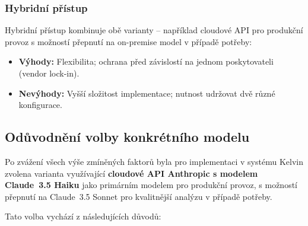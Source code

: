 \subsubsection*{Hybridní přístup}

Hybridní přístup kombinuje obě varianty -- například cloudové API pro produkční provoz s možností přepnutí na on-premise model v případě potřeby:
\begin{itemize}
    \item \textbf{Výhody:} Flexibilita; ochrana před závislostí na jednom poskytovateli (vendor lock-in).
    \item \textbf{Nevýhody:} Vyšší složitost implementace; nutnost udržovat dvě různé konfigurace.
\end{itemize}

\subsection{Odůvodnění volby konkrétního modelu}
\label{subsec:choice-justification}

Po zvážení všech výše zmíněných faktorů byla pro implementaci v systému Kelvin zvolena varianta využívající \textbf{cloudové API Anthropic s modelem Claude~3.5 Haiku} jako primárním modelem pro produkční provoz, s možností přepnutí na Claude~3.5 Sonnet pro kvalitnější analýzu v případě potřeby.

Tato volba vychází z následujících důvodů:

